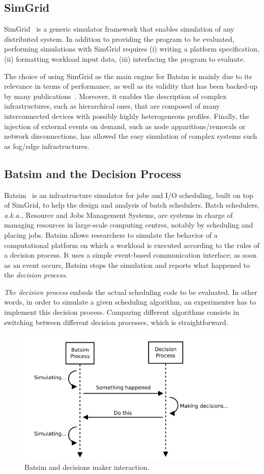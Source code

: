 \subsection{SimGrid}
SimGrid~\cite{simgrid} is a generic simulator framework that enables simulation of any distributed system. 
In addition to providing the program to be evaluated, performing simulations with SimGrid requires (i) writing a platform specification, (ii) formatting workload input data, (iii) interfacing the program to evaluate. 

The choice of using SimGrid as the main engine for Batsim is mainly due to its relevance in terms of performance, as well as its validity that has been backed-up by many publications~\cite{simgrid_publis}.
Moreover, it enables the description of complex infrastructures, such as hierarchical ones, that are composed of many interconnected devices with 
possibly highly heterogeneous profiles.
Finally, the injection of external events on demand, such as node apparitions/removals or network disconnections, has allowed the easy simulation of complex systems such as fog/edge infrastructures.

\subsection{Batsim and the Decision Process}
Batsim~\cite{batsim} is an infrastructure simulator for jobs and I/O scheduling, built on top of SimGrid, to help the design and analysis of batch schedulers.
Batch schedulers, \textit{a.k.a.,} Resource and Jobs Management Systems, are systems in charge of  managing resources in large-scale computing centres, notably by scheduling and placing jobs. Batsim allows researchers to simulate the behavior of a computational platform on which a workload is executed according to the rules of a decision process.
It uses a simple event-based communication interface; as soon as an event occurs, Batsim stops the simulation and reports what happened to the \emph{decision process}.

\emph{The decision process} embeds the actual scheduling code to be evaluated. 
In other words, in order to simulate a given scheduling algorithm, an experimenter has to implement this decision process. Comparing different algorithms consists in 
switching between different decision processes, which is straightforward.

\begin{figure} %
    \centering
    \includegraphics[width=.8\textwidth]{images/batsim-pybatsim.png}
    \caption{Batsim and decisions maker interaction.}
    \label{fig:batsim-pybatsim}
\end{figure}


